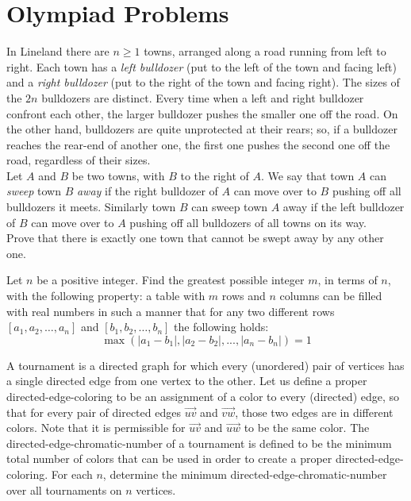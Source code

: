 \documentclass{article}
\begin{document}
\section{Olympiad Problems}
\begin{prob}[Shortlist 2015 C1]{6}
In Lineland there are $n\geq1$ towns, arranged along a road running from left to right. Each town has a \textit{left bulldozer} (put to the left of the town and facing left) and a \textit{right bulldozer} (put to the right of the town and facing right). The sizes of the $2n$ bulldozers are distinct. Every time when a left and right bulldozer confront each other, the larger bulldozer pushes the smaller one off the road. On the other hand, bulldozers are quite unprotected at their rears; so, if a bulldozer reaches the rear-end of another one, the first one pushes the second one off the road, regardless of their sizes.\\[1\baselineskip]Let $A$ and $B$ be two towns, with $B$ to the right of $A$. We say that town $A$ can \textit{sweep} town $B$ \textit{away} if the right bulldozer of $A$ can move over to $B$ pushing off all bulldozers it meets. Similarly town $B$ can sweep town $A$ away if the left bulldozer of $B$ can move over to $A$ pushing off all bulldozers of all towns on its way.\\[1\baselineskip]Prove that there is exactly one town that cannot be swept away by any other one.
\end{prob}

\begin{prob}[EGMO 2012/2]{6}
Let $n$ be a positive integer. Find the greatest possible integer $m$, in terms of $n$, with the following property: a table with $m$ rows and $n$ columns can be filled with real numbers in such a manner that for any two different rows $\left[ {{a_1},{a_2},\ldots,{a_n}}\right]$ and $\left[ {{b_1},{b_2},\ldots,{b_n}} \right]$ the following holds: \[\max\left( {\left| {{a_1} - {b_1}} \right|,\left| {{a_2} - {b_2}} \right|,...,\left| {{a_n} - {b_n}} \right|} \right) = 1\]
\end{prob}

\begin{prob}{9}
A tournament is a directed graph for which every (unordered) pair of vertices has a single directed edge from one vertex to the other.  Let us define a proper directed-edge-coloring to be an assignment of a color to every (directed) edge, so that for every pair of directed edges $\overrightarrow{uv}$ and $\overrightarrow{vw}$, those two edges are in different colors.  Note that it is permissible for $\overrightarrow{uv}$ and $\overrightarrow{uw}$ to be the same color.  The directed-edge-chromatic-number of a tournament is defined to be the minimum total number of colors that can be used in order to create a proper directed-edge-coloring.  For each $n$, determine the minimum directed-edge-chromatic-number over all tournaments on $n$ vertices.
\end{prob}
\end{document}
